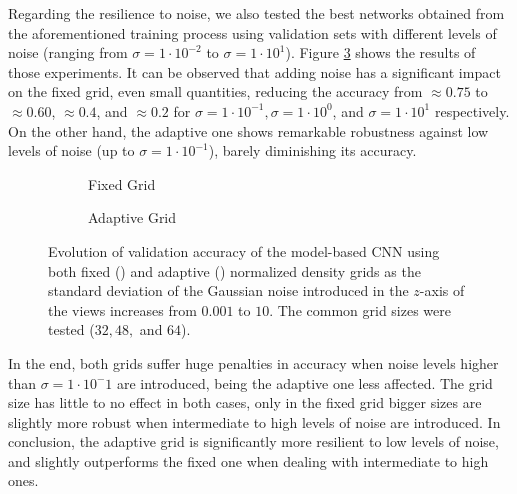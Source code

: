 Regarding the resilience to noise, we also tested the best networks obtained from the aforementioned training process using validation sets with different levels of noise (ranging from $\sigma=1\cdot10^{-2}$ to $\sigma=1\cdot10^1$). Figure \ref{fig:objrecog:3dcnn:experiments:25d_density_noise} shows the results of those experiments. It can be observed that adding noise has a significant impact on the fixed grid, even small quantities, reducing the accuracy from $\approx0.75$ to $\approx0.60$, $\approx0.4$, and $\approx0.2$ for $\sigma=1\cdot10^{-1}, \sigma=1\cdot{10^0}$, and $\sigma=1\cdot10^1$ respectively. On the other hand, the adaptive one shows remarkable robustness against low levels of noise (up to $\sigma=1\cdot10^{-1}$), barely diminishing its accuracy.

\begin{figure}[!t]
	\centering
	\begin{subfigure}{0.49\textwidth}
		
		\caption{Fixed Grid}
		\label{subfig:objrecog:3dcnn:experiments:25d_fixed_density_noise}
	\end{subfigure}
	\begin{subfigure}{0.49\textwidth}
		
		\caption{Adaptive Grid}
		\label{subfig:objrecog:3dcnn:experiments:25d_adaptive_density_noise}
	\end{subfigure}
	\caption{Evolution of validation accuracy of the model-based \acs{CNN} using both fixed () and adaptive () normalized density grids as the standard deviation of the Gaussian noise introduced in the $z$-axis of the views increases from $0.001$ to $10$. The common grid sizes were tested ($32, 48, $ and $64$).}
	\label{fig:objrecog:3dcnn:experiments:25d_density_noise}
\end{figure}

In the end, both grids suffer huge penalties in accuracy when noise levels higher than $\sigma=1\cdot10^-1$ are introduced, being the adaptive one less affected. The grid size has little to no effect in both cases, only in the fixed grid bigger sizes are slightly more robust when intermediate to high levels of noise are introduced. In conclusion, the adaptive grid is significantly more resilient to low levels of noise, and slightly outperforms the fixed one when dealing with intermediate to high ones.

